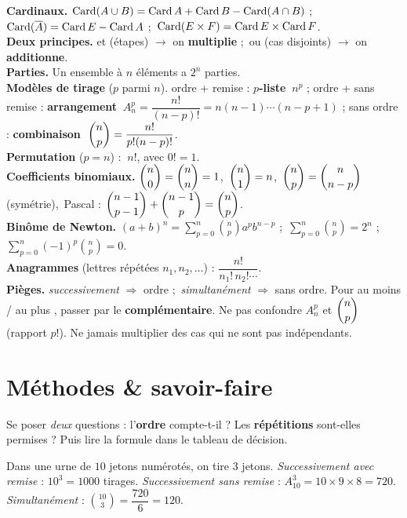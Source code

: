 \begin{synthese}
\textbf{Cardinaux.} $\operatorname{Card}(A\cup B)=\operatorname{Card} A+\operatorname{Card} B-\operatorname{Card}(A\cap B)$ ;\
$\operatorname{Card}(\overline A)=\operatorname{Card} E-\operatorname{Card} A$ ;\ $\operatorname{Card}(E\times F)=\operatorname{Card} E\times\operatorname{Card} F$.\\[4pt]
\textbf{Deux principes.} \og et \fg{} (étapes) $\to$ on \textbf{multiplie} ;\ \og ou \fg{}
(cas disjoints) $\to$ on \textbf{additionne}.\\[4pt]
\textbf{Parties.} Un ensemble à $n$ éléments a $2^{n}$ parties.\\[4pt]
\textbf{Modèles de tirage} ($p$ parmi $n$).\quad
ordre + remise : \textbf{$p$-liste} $\ n^{p}$ ;\quad
ordre + sans remise : \textbf{arrangement} $\ A_n^{p}=\dfrac{n!}{(n-p)!}=n(n-1)\cdots(n-p+1)$ ;\quad
sans ordre : \textbf{combinaison} $\ \dbinom np=\dfrac{n!}{p!(n-p)!}$.\\[4pt]
\textbf{Permutation} ($p=n$) : $\ n!$, avec $0!=1$.\\[4pt]
\textbf{Coefficients binomiaux.} $\dbinom n0=\dbinom nn=1$,\ $\dbinom n1=n$,\
$\dbinom np=\dbinom{n}{n-p}$ (symétrie),\ Pascal : $\dbinom{n-1}{p-1}+\dbinom{n-1}{p}=\dbinom np$.\\[4pt]
\textbf{Binôme de Newton.} $\displaystyle (a+b)^{n}=\sum_{p=0}^{n}\binom np a^{p}b^{n-p}$ ;\
$\displaystyle\sum_{p=0}^{n}\binom np=2^{n}$ ;\ $\displaystyle\sum_{p=0}^{n}(-1)^{p}\binom np=0$.\\[4pt]
\textbf{Anagrammes} (lettres répétées $n_1,n_2,\dots$) : $\dfrac{n!}{n_1!\,n_2!\cdots}$.\\[4pt]
\textbf{Pièges.} \emph{successivement} $\Rightarrow$ ordre ;\ \emph{simultanément} $\Rightarrow$
sans ordre. Pour \og au moins \fg{} / \og au plus \fg, passer par le \textbf{complémentaire}.
Ne pas confondre $A_n^{p}$ et $\dbinom np$ (rapport $p!$). Ne jamais multiplier des cas
qui ne sont pas indépendants.
\end{synthese}

\section{Méthodes \& savoir-faire}

Se poser \emph{deux} questions : l'\textbf{ordre} compte-t-il ? Les \textbf{répétitions} sont-elles permises ? Puis lire la formule dans le tableau de décision.
\begin{exemple}
Dans une urne de $10$ jetons numérotés, on tire $3$ jetons.
\emph{Successivement avec remise} : $10^{3}=1000$ tirages.
\emph{Successivement sans remise} : $A_{10}^{3}=10\times 9\times 8=720$.
\emph{Simultanément} : $\binom{10}{3}=\dfrac{720}{6}=120$.
\end{exemple}

